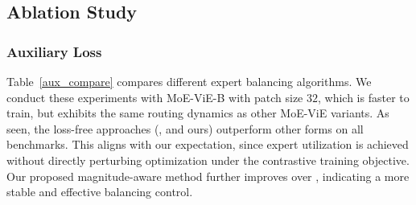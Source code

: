 \documentclass[runningheads]{llncs}
\begin{document}
\subsection{Ablation Study}
\label{ablation}

\subsubsection{Auxiliary Loss} Table~\ref{aux_compare} compares different expert balancing algorithms. We conduct these experiments with MoE-ViE-B with patch size $32$, which is faster to train, but exhibits the same routing dynamics as other MoE-ViE variants. As seen, the loss-free approaches (\ie, \cite{aux_free} and ours) outperform other forms on all benchmarks. This aligns with our expectation, since expert utilization is achieved without directly perturbing optimization under the contrastive training objective. Our proposed magnitude-aware method further improves over \cite{aux_free}, indicating a more stable and effective balancing control.
\end{document}
